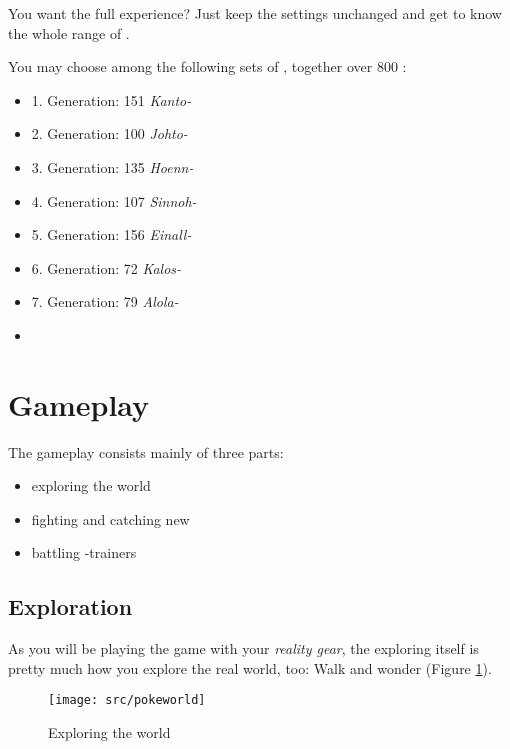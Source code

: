 You want the full experience? Just keep the settings unchanged and get to know the whole range of \poke{}.

You may choose among the following sets of \poke{}, together over 800 \poke{}:
\begin{multicols}{2}
\begin{itemize}
\setlength\itemsep{.05em}
\item 1. Generation: 151 \emph{Kanto-\pokeT}
\item 2. Generation: 100 \emph{Johto-\pokeT}
\item 3. Generation: 135 \emph{Hoenn-\pokeT}
\item 4. Generation: 107 \emph{Sinnoh-\pokeT}
\item 5. Generation: 156 \emph{Einall-\pokeT}
\item 6. Generation: 72 \emph{Kalos-\pokeT}
\item 7. Generation: 79 \emph{Alola-\pokeT}
\item[]
\end{itemize}
\end{multicols}

\section{Gameplay}

The gameplay consists mainly of three parts:
\begin{itemize}
\item exploring the world
\item fighting and catching new \poke{}
\item battling \poke{}-trainers
\end{itemize}

\subsection{Exploration}

As you will be playing the game with your \emph{\poke{} reality gear}, the exploring itself is pretty much how you explore the real world, too: Walk and wonder (Figure \ref{exploration}).

\begin{figure}[!ht]
\begin{center}
\texttt{[image: src/pokeworld]}
\end{center}
\caption[Exploring the \pokeT{} world]{Exploring the \poke{} world}
\label{exploration}
\end{figure}

